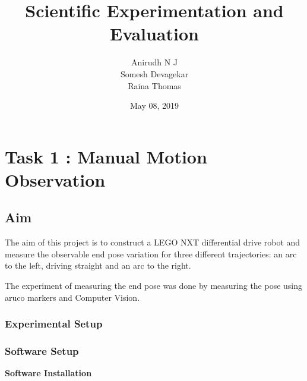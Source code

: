 \documentclass[10pt,a4paper]{article}
\author{\vspace{0.4cm}
	\Large{Anirudh N J}\\\vspace{0.4cm}
	\Large{Somesh Devagekar} \\\vspace{0.8cm}
	\Large{Raina Thomas}}
\title{
	\vspace*{5cm}
	\textbf{\Large{Scientific Experimentation and Evaluation}}
	}
\date{May 08, 2019}
\begin{document}
\begin{titlepage}

	\maketitle
	
\end{titlepage}

	\Large
	\tableofcontents
	\newpage



\section{Task 1 : Manual Motion Observation}

\subsection{Aim}
\Large
The aim of this project is to construct a LEGO NXT differential drive robot and measure the observable end pose variation for three different trajectories: an arc to the left, driving straight and an arc to the right.
\vspace{0.5cm}

The experiment of measuring the end pose was done by measuring the pose using aruco markers and Computer Vision.
   

\subsubsection{Experimental Setup}
	
	\subsubsection{Software Setup}
		\vspace{0.3cm}
	\textbf{Software Installation}\\
			
\end{document}
